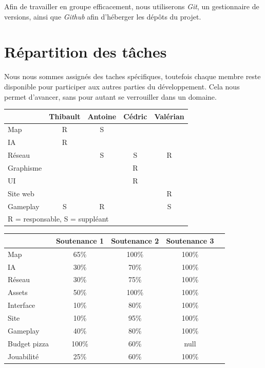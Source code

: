 \documentclass[12pt]{report}
\begin{document}
Afin de travailler en groupe efficacement, nous utiliserons \textit{Git}, un gestionnaire de versions, ainsi que \textit{Github} afin d’héberger les dépôts du projet.

\chapter{Répartition des tâches}

Nous nous sommes assignés des taches spécifiques, toutefois chaque membre reste disponible pour participer aux autres parties du développement. Cela nous permet d’avancer, sans pour autant se verrouiller dans un domaine.

\begin{center}
    \begin{tabular}{@{} l *4c @{}}
        \toprule
        \multicolumn{1}{c}{}    & \textbf{Thibault}  & \textbf{Antoine}  & \textbf{Cédric} & \textbf{Valérian} \\ 
        \midrule
        Map & R & S & & \\
        IA & R & & & \\
        Réseau & & S & S & R \\
        Graphisme & & & R & \\
        UI & & & R & \\
        Site web & & & & R \\
        Gameplay & S & R & & S\\
        \bottomrule
        \multicolumn{4}{l}{\footnotesize R = responsable, S = suppléant}\\
    \end{tabular}
\end{center}

\vspace{2em}

\begin{center}
    \begin{tabular}{@{} l *4c @{}}
        \toprule
        \multicolumn{1}{c}{}    & \textbf{Soutenance 1}  & \textbf{Soutenance 2}  & \textbf{Soutenance 3} \\ 
        \midrule
        Map & 65\% & 100\% & 100\% \\
        IA & 30\% & 70\% & 100\% \\
        Réseau & 30\% & 75\% & 100\% \\
        Assets & 50\% & 100\% & 100\% \\
        Interface & 10\% & 80\% & 100\% \\
        Site & 10\% & 95\% & 100\% \\
        Gameplay & 40\% & 80\% & 100\% \\
        Budget pizza & 100\% & 60\% & null\\
        \midrule
        Jouabilité & 25\% & 60\% & 100\% \\
        \bottomrule
    \end{tabular}
\end{center}
\end{document}
